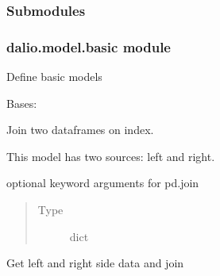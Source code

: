 \documentclass[letterpaper,10pt,english]{sphinxmanual}
\begin{document}
\subsubsection{Submodules}
\label{\detokenize{dalio.model:submodules}}

\subsubsection{dalio.model.basic module}
\label{\detokenize{dalio.model:module-dalio.model.basic}}\label{\detokenize{dalio.model:dalio-model-basic-module}}
Define basic models

\begin{fulllineitems}
\label{\detokenize{dalio.model:dalio.model.basic.Join}}
Bases: {\hyperref[\detokenize{dalio.model:dalio.model.model.Model}]{}}

Join two dataframes on index.

This model has two sources: left and right.

\begin{fulllineitems}
\label{\detokenize{dalio.model:dalio.model.basic.Join._kwargs}}
optional keyword arguments for pd.join
\begin{quote}\begin{description}
\item[{Type}] \leavevmode
dict

\end{description}\end{quote}

\end{fulllineitems}


\begin{fulllineitems}
\label{\detokenize{dalio.model:dalio.model.basic.Join.run}}
Get left and right side data and join

\end{fulllineitems}


\end{fulllineitems}
\end{document}
